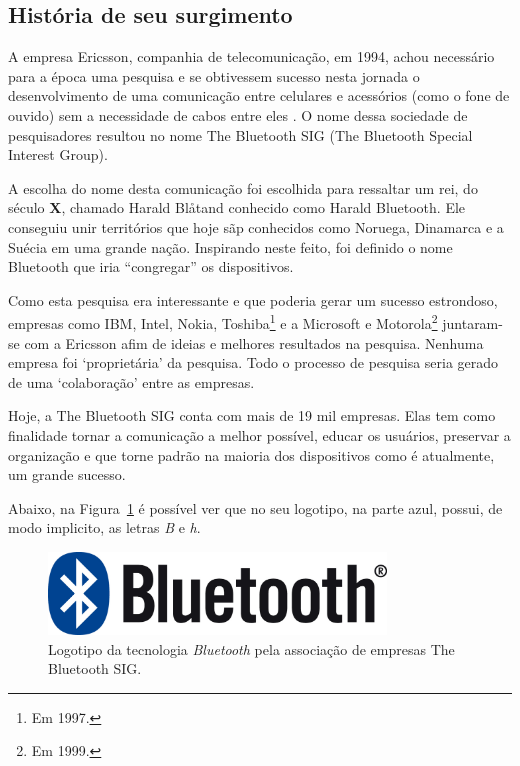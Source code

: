 \documentclass[portugues, brazil, a4paper,12pt]{article}
\begin{document}
\subsection{História de seu surgimento}

A empresa Ericsson, companhia de telecomunicação, em 1994, achou necessário para a época uma pesquisa e se obtivessem sucesso nesta jornada o desenvolvimento de uma comunicação entre celulares e acessórios (como o fone de ouvido) sem a necessidade de cabos entre eles . O nome dessa sociedade de pesquisadores resultou no nome The Bluetooth SIG (The Bluetooth Special Interest Group).

A escolha do nome desta comunicação foi escolhida para ressaltar um rei, do século \textbf{X}, chamado Harald Bl\r{a}tand conhecido como Harald Bluetooth. Ele conseguiu unir territórios que hoje sãp conhecidos como Noruega, Dinamarca e a Suécia em uma grande nação. Inspirando neste feito, foi definido o nome Bluetooth que iria ``congregar'' os dispositivos.

Como esta pesquisa era interessante e que poderia gerar um sucesso estrondoso, empresas como IBM, Intel, Nokia, Toshiba\footnote{Em 1997.} e a Microsoft e Motorola\footnote{Em 1999.} juntaram-se com a Ericsson afim de ideias e melhores resultados na pesquisa. Nenhuma empresa foi `proprietária' da pesquisa. Todo o processo de pesquisa seria gerado de uma `colaboração' entre as empresas.

Hoje, a The Bluetooth SIG conta com mais de 19 mil empresas. Elas tem como finalidade tornar a comunicação a melhor possível, educar os usuários, preservar a organização e que torne padrão na maioria dos dispositivos como é atualmente, um grande sucesso.

Abaixo, na Figura~\ref{fig:bt} é possível ver que no seu logotipo, na parte azul, possui, de modo implicito, as letras \textit{B} e \textit{h}.

\begin{figure}[h]
	\centering
	\includegraphics[width=0.8\textwidth]{bluetooth.png}
	\caption{Logotipo da tecnologia \textit{Bluetooth} pela associação de empresas The Bluetooth SIG.}
	\label{fig:bt}
\end{figure}
\end{document}
